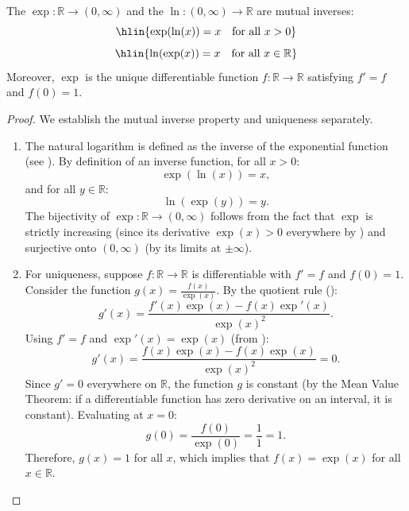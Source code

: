 \begin{proposition} \label{proposition:exponential_and_logarithm_are_mutual_inverses}
The  $\exp : \mathbb{R} \to (0, \infty)$ and the  $\ln : (0, \infty) \to \mathbb{R}$ are mutual inverses:
$$\hlin{\exp(\ln(x)) = x \quad \text{for all } x > 0}$$
$$\hlin{\ln(\exp(x)) = x \quad \text{for all } x \in \mathbb{R}}$$
Moreover, $\exp$ is the unique differentiable function $f : \mathbb{R} \to \mathbb{R}$ satisfying $f' = f$ and $f(0) = 1$.
\end{proposition}
\begin{proof}
    We establish the mutual inverse property and uniqueness separately.

    \begin{enumerate}
        \item The natural logarithm is defined as the inverse of the exponential function (see ). By definition of an inverse function, for all $x > 0$:
        $$\exp(\ln(x)) = x,$$
        and for all $y \in \mathbb{R}$:
        $$\ln(\exp(y)) = y.$$
        The bijectivity of $\exp : \mathbb{R} \to (0, \infty)$ follows from the fact that $\exp$ is strictly increasing (since its derivative $\exp(x) > 0$ everywhere by ) and surjective onto $(0, \infty)$ (by its limits at $\pm\infty$).

        \item For uniqueness, suppose $f : \mathbb{R} \to \mathbb{R}$ is differentiable with $f' = f$ and $f(0) = 1$. Consider the function $g(x) = \frac{f(x)}{\exp(x)}$. By the quotient rule ():
        $$g'(x) = \frac{f'(x)\exp(x) - f(x)\exp'(x)}{\exp(x)^2}.$$
        Using $f' = f$ and $\exp'(x) = \exp(x)$ (from ):
        $$g'(x) = \frac{f(x)\exp(x) - f(x)\exp(x)}{\exp(x)^2} = 0.$$
        Since $g' = 0$ everywhere on $\mathbb{R}$, the function $g$ is constant (by the Mean Value Theorem: if a differentiable function has zero derivative on an interval, it is constant). Evaluating at $x = 0$:
        $$g(0) = \frac{f(0)}{\exp(0)} = \frac{1}{1} = 1.$$
        Therefore, $g(x) = 1$ for all $x$, which implies that $f(x) = \exp(x)$ for all $x \in \mathbb{R}$.
    \end{enumerate}
\end{proof}

